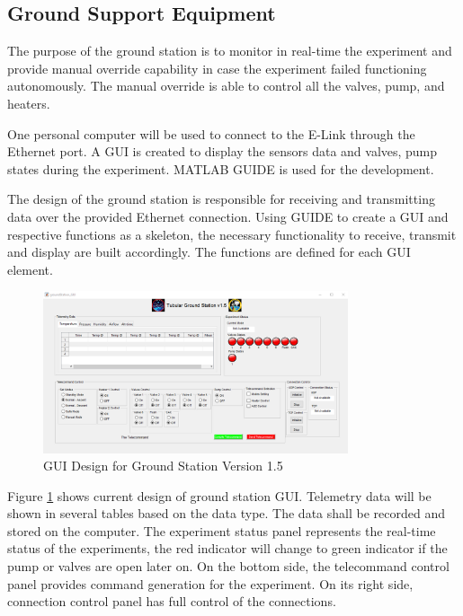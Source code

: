 \documentclass[a4paper,12pt,twoside]{article}
\providecommand{\DIFaddtex}[1]{{\protect\color{blue}\uwave{#1}}} %
\providecommand{\DIFaddFL}[1]{\DIFadd{#1}} %
\providecommand{\DIFaddbeginFL}{} %
\providecommand{\DIFaddendFL}{} %
\providecommand{\DIFadd}[1]{\texorpdfstring{\DIFaddtex{#1}}{#1}} %
\newcommand{\DIFaddincludegraphics}[2][]{{\color{blue}\fbox{\DIFOincludegraphics[#1]{#2}}}} %
\DeclareRobustCommand{\DIFaddbeginFL}{\DIFOaddbeginFL \let\includegraphics\DIFaddincludegraphics} %
\DeclareRobustCommand{\DIFaddendFL}{\DIFOaddendFL \let\includegraphics\DIFOincludegraphics} %
\begin{document}
\subsection{Ground Support Equipment}\label{sec:4.9}
The purpose of the ground station is to monitor in real-time the experiment and provide manual override capability in case the experiment failed functioning autonomously. The manual override is able to control all the valves, pump, and heaters. \par
One personal computer will be used to connect to the E-Link through the Ethernet port. A GUI is created to display the sensors data and valves, pump states during the experiment. MATLAB GUIDE is used for the development. \par
The design of the ground station is responsible for receiving and transmitting data over the provided Ethernet connection. Using GUIDE to create a GUI and respective functions as a skeleton, the necessary  functionality to receive, transmit and display are built accordingly. The functions are defined for each GUI element.
\begin{figure}[H]
    \centering
    \includegraphics[width=0.8\textwidth]{4-experiment-design/img/GS-GUI2.png}
    \caption{GUI Design for Ground Station Version 1.5\DIFaddbeginFL \DIFaddFL{.}\DIFaddendFL }
    \label{fig:guiDesign}
\end{figure}
Figure \ref{fig:guiDesign} shows current design of ground station GUI. Telemetry data will be shown in several tables based on the data type. The data shall be recorded and stored on the computer. The experiment status panel represents the real-time status of the experiments, the red indicator will change to green indicator if the pump or valves are open later on. On the bottom side, the telecommand control panel provides command generation for the experiment. On its right side, connection control panel has full control of the connections.


\raggedbottom
\raggedbottom
\pagebreak
\end{document}
